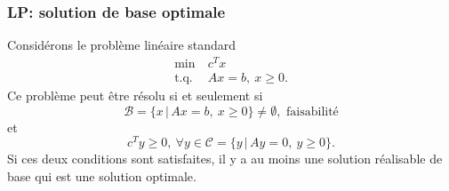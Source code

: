 

\begin{frame}
	\frametitle{LP: solution de base optimale}
	
	\begin{theo}[Optimalité LP]
		Considérons le problème linéaire standard
		\begin{align*}
			\min\ & c^Tx \\
			\mbox{t.q. } & Ax = b,\ x \geq 0.
		\end{align*}
		Ce problème peut être résolu si et seulement si
		\[
		\mathcal{B} = \lbrace x \,|\, Ax = b,\ x \geq 0 \rbrace \ne \emptyset, \mbox{ faisabilité}
		\]
		et
		\[
		c^Ty \geq 0,\ \forall y \in \mathcal{C} = \lbrace y \,|\, Ay = 0,\ y \geq 0 \rbrace.
		\]
		Si ces deux conditions sont satisfaites, il y a au moins une solution
		réalisable de base qui est une solution optimale.
	\end{theo}
\end{frame}
